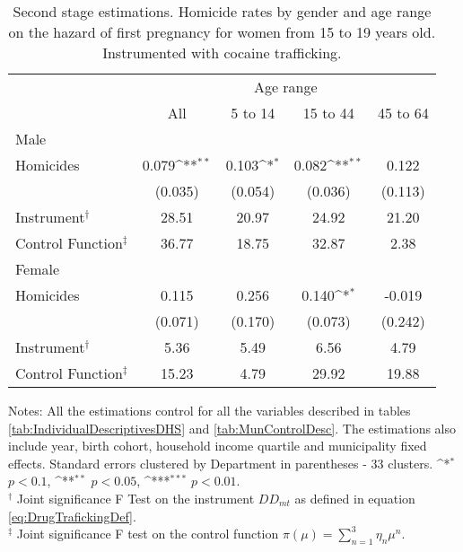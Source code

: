 \documentclass[a4paper,10pt,twocolumn,preprint,3p,authoryear]{elsarticle}
\def\sym#1{\ifmmode^{#1}\else\(^{#1}\)\fi}
\begin{document}
\begin{table}[h]
	\caption{\\ Second stage estimations. Homicide rates by gender and age range on the hazard of first pregnancy for women from 15 to 19 years old. Instrumented with cocaine trafficking.}
	\footnotesize
	\begin{tabular}{lcccc}
		\hline
		& \multicolumn{4}{c}{{ Age range}} \\
		&	All&	5 to 14&	15 to 44& 	45  to 64 \\
		\hline
		\multicolumn{5}{l}{{Male}} \\
					
Homicides	&	       0.079\sym{**} &	       0.103\sym{*}  &	       0.082\sym{**} &	       0.122         \\
	&	     (0.035)         &	     (0.054)         &	     (0.036)         &	     (0.113)         \\
Instrument$^{\dagger}$	&	       28.51         &	       20.97         &	       24.92         &	       21.20         \\
Control Function$^{\ddagger}$	&	       36.77         &	       18.75         &	       32.87         &	        2.38         \\
\hline
\multicolumn{5}{l}{{Female}} \\				
Homicides	&	       0.115         &	       0.256         &	       0.140\sym{*}  &	      -0.019         \\
	&	     (0.071)         &	     (0.170)         &	     (0.073)         &	     (0.242)         \\
Instrument$^{\dagger}$	&	        5.36         &	        5.49         &	        6.56         &	        4.79         \\
Control Function$^{\ddagger}$ &	       15.23         &	        4.79         &	       29.92         &	       19.88         \\
\hline
	\end{tabular}
	\begin{minipage}[t]{1\columnwidth}%
		  \begin{spacing}{1}
		  \noindent 
		  {Notes: All the estimations control for all the variables described in tables \ref{tab:IndividualDescriptivesDHS} and \ref{tab:MunControlDesc}. The estimations also include year, birth cohort, household income quartile and municipality fixed effects. Standard errors clustered by Department in parentheses - 33 clusters. \sym{*} $p<0.1$, \sym{**} $p<0.05$, \sym{***} $p<0.01$. \\
			 $^{\dagger}$ Joint significance F Test on the instrument $DD_{mt}$ as defined in equation \ref{eq:DrugTrafickingDef}. \\
			 $^{\ddagger}$ Joint significance F test on the control function $\pi\left( \mu \right) = \sum_{n=1}^{3}\eta_{n}\mu^{n}$.
		 } 		 
		  \end{spacing}
	  \end{minipage}
	\label{tab:SSHomRatesByGender}
\end{table}
\end{document}
